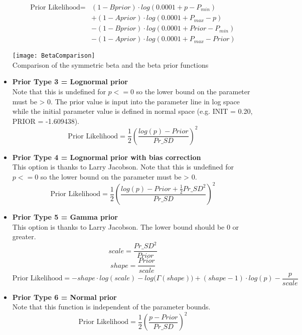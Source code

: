 \begin{itemize}
	\begin{equation}
          \begin{split}
		\text{Prior Likelihood} = & (1 - Bprior) \cdot log(0.0001 + p - P_{min}) \\
		& + (1 - Aprior) \cdot log(0.0001 + P_{max} - p) \\
		& - (1 - Bprior) \cdot log(0.0001 + Prior - P_{min}) \\
		& - (1 - Aprior) \cdot log(0.0001 + P_{max} - Prior)
	  \end{split}
	\end{equation}

	\begin{center}
		\texttt{[image: BetaComparison]}\\
		Comparison of the symmetric beta and the beta prior functions
	\end{center}

\item \textbf{Prior Type 3 = Lognormal prior} \\ 
Note that this is undefined for $p <= 0$ so the lower bound on the parameter must be > 0. The prior value is input into the parameter line in log space while the initial parameter value is defined in normal space (e.g. INIT = 0.20, PRIOR = -1.609438).
	\begin{equation}
	\text{Prior Likelihood} = \frac{1}{2} \left(\frac{log(p)-Prior}{Pr\_SD}\right)^2
	\end{equation}

\item \textbf{Prior Type 4 = Lognormal prior with bias correction} \\ 
This option is thanks to Larry Jacobson. Note that this is undefined for $p <= 0$ so the lower bound on the parameter must be > 0.
	\begin{equation}
	\text{Prior Likelihood} = \frac{1}{2} \left(\frac{log(p)-Prior + \frac{1}{2}{Pr\_SD}^2}{Pr\_SD}\right)^2
	\end{equation}

\item \textbf{Prior Type 5 = Gamma prior} \\ 
This option is thanks to Larry Jacobson. The lower bound should be 0 or greater.
	\begin{equation}
          scale = \frac{{Pr\_SD}^2}{Prior}
	\end{equation}
	\begin{equation}
          shape = \frac{Prior}{scale}
	\end{equation}
	\begin{equation}
          \text{Prior Likelihood} = -shape \cdot log(scale) - log\big(\Gamma(shape)\big) + (shape - 1) \cdot log(p) - \frac{p}{scale}
	\end{equation}

\item \textbf{Prior Type 6 = Normal prior} \\ 
Note that this function is independent of the parameter bounds.
		\begin{equation}
		\text{Prior Likelihood} = \frac{1}{2} \left(\frac{p - Prior}{Pr\_SD}\right)^2
		\end{equation}
\end{itemize}
